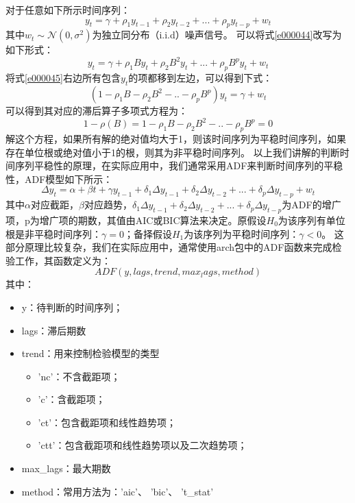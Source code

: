 对于任意如下所示时间序列：
\begin{equation}
y_{t}=\gamma + \rho _{1}y_{t-1} + \rho _{2}y_{t-2} + ... + \rho _{p}y_{t-p} + w_{t}
\label{e000044}
\end{equation}
其中$w_{t} \sim \mathcal{N}(0, \sigma ^{2})$为独立同分布（i.i.d）噪声信号。
可以将式\ref{e000044}改写为如下形式：
\begin{equation}
y_{t}=\gamma + \rho _{1}By_{t} + \rho _{2}B^{2}y_{t} + ...  + \rho _{p}B^{p}y_{t} + w_{t}
\label{e000045}
\end{equation}
将式\ref{e000045}右边所有包含$y_{t}$的项都移到左边，可以得到下式：
\begin{equation}
(1-\rho _{1}B - \rho _{2}B^{2} - .. - \rho _{p}B^{p})y_{t}=\gamma + w_{t}
\label{e000046}
\end{equation}
可以得到其对应的滞后算子多项式方程为：
\begin{equation}
1-\rho(B)=1-\rho _{1}B - \rho _{2}B^{2} - .. - \rho _{p}B^{p}=0
\label{e000047}
\end{equation}
解这个方程，如果所有解的绝对值均大于1，则该时间序列为平稳时间序列，如果存在单位根或绝对值小于1的根，则其为非平稳时间序列。\newline
以上我们讲解的判断时间序列平稳性的原理，在实际应用中，我们通常采用ADF来判断时间序列的平稳性，ADF模型如下所示：
\begin{equation}
\Delta y_{t}=\alpha + \beta t + \gamma y_{t-1} + \delta _{1}\Delta y_{t-1} + \delta _{2}\Delta y_{t-2} + ... + \delta _{p}\Delta y_{t-p} + w_{t}
\label{e000048}
\end{equation}
其中$\alpha$对应截距，$\beta$对应趋势，$\delta _{1}\Delta y_{t-1} + \delta _{2}\Delta y_{t-2} + ... + \delta _{p}\Delta y_{t-p}$为ADF的增广项，p为增广项的期数，其值由AIC或BIC算法来决定。原假设$H_{0}$为该序列有单位根是非平稳时间序列：$\gamma = 0$；备择假设$H_{1}$为该序列为平稳时间序列：$\gamma < 0$。\newline
这部分原理比较复杂，我们在实际应用中，通常使用arch包中的ADF函数来完成检验工作，其函数定义为：
\begin{equation}
ADF(y, lags, trend, max_lags, method)
\label{e000049}
\end{equation}
其中：
\begin{itemize}
\item y：待判断的时间序列；
\item lags：滞后期数
\item trend：用来控制检验模型的类型
	\begin{itemize}
	\item 'nc'：不含截距项；
	\item 'c'：含截距项；
	\item 'ct'：包含截距项和线性趋势项；
	\item 'ctt'：包含截距项和线性趋势项以及二次趋势项；
	\end{itemize}
\item max\_lags：最大期数
\item method：常用方法为：'aic'、 'bic'、 't\_stat'
\end{itemize}
